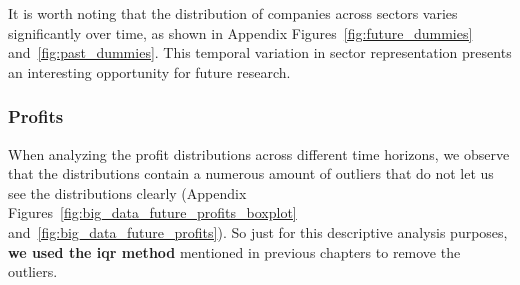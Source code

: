 \documentclass[11pt,english,a4paper,hidelinks]{book}
\begin{document}
\vspace{0.5cm}
\noindent It is worth noting that the distribution of companies across sectors varies significantly over time, as shown in Appendix Figures~\ref{fig:future_dummies} and~\ref{fig:past_dummies}. This temporal variation in sector representation presents an interesting opportunity for future research.

\subsubsection{Profits}

\noindent When analyzing the profit distributions across different time horizons, we observe that the distributions contain a numerous amount of outliers that do not let us see the distributions clearly (Appendix Figures~\ref{fig:big_data_future_profits_boxplot} and~\ref{fig:big_data_future_profits}). So just for this descriptive analysis purposes, \textbf{we used the \acrshort{iqr} method} mentioned in previous chapters to remove the outliers.
\end{document}
